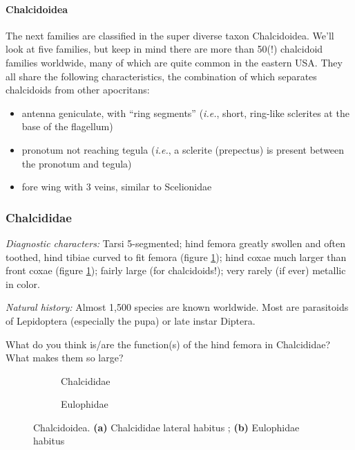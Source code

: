 \paragraph*{Chalcidoidea} The next families are classified in the super diverse taxon Chalcidoidea. We'll look at five families, but keep in mind there are more than 50(!) chalcidoid families worldwide, many of which are quite common in the eastern USA. They all share the following characteristics, the combination of which separates chalcidoids from other apocritans:
\begin{itemize}
\item antenna geniculate, with ``ring segments'' (\textit{i.e.}, short, ring-like sclerites at the base of the flagellum)
\item pronotum not reaching tegula (\textit{i.e.}, a sclerite (prepectus) is present between the pronotum and tegula)
\item fore wing with 3 veins, similar to Scelionidae
\end{itemize}

\subsubsection{Chalcididae}
\noindent{}\textit{Diagnostic characters:} Tarsi 5-segmented; hind femora greatly swollen and often toothed, hind tibiae curved to fit femora (figure \ref{fig:chalcidid}); hind coxae much larger than front coxae (figure \ref{fig:chalcidid}); fairly large (for chalcidoids!); very rarely (if ever) metallic in color.\vspace{3mm}

\noindent{}\textit{Natural history:} Almost 1,500 species are known worldwide. Most are parasitoids of Lepidoptera (especially the pupa) or late instar Diptera.\vspace{3mm}

\begin{theo}
{}What do you think is/are the function(s) of the hind femora in Chalcididae? What makes them so large?
\end{theo}

\begin{figure}[ht!]
  \centering
\begin{subfigure}[ht!]{0.45\textwidth}
  \caption{Chalcididae}
  \label{fig:chalcidid}
\end{subfigure}
    \hfill
\begin{subfigure}[ht!]{0.45\textwidth}
  \caption{Eulophidae}
  \label{fig:eulophid}
\end{subfigure}
\caption{Chalcidoidea. \textbf{(a)} Chalcididae lateral habitus \citep[][Fig. 212]{goulet1993hymenoptera}; \textbf{(b)} Eulophidae habitus \citep[][Fig. 228]{goulet1993hymenoptera}}
\label{fig:xxxxxx}
\end{figure}

